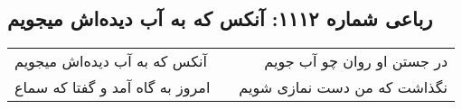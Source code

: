 \begin{center}
\section*{رباعی شماره ۱۱۱۲: آنکس که به آب دیده‌اش میجویم}
\label{sec:1112}
\begin{longtable}{l p{0.5cm} r}
آنکس که به آب دیده‌اش میجویم
&&
در جستن او روان چو آب جویم
\\
امروز به گاه آمد و گفتا که سماع
&&
نگذاشت که من دست نمازی شویم
\\
\end{longtable}
\end{center}
